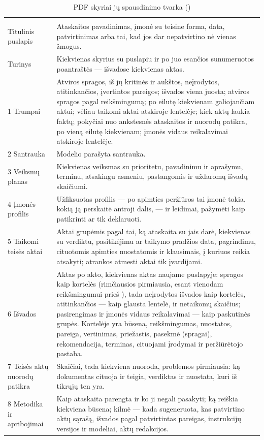 \begin{xltabular}{\textwidth}{@{}L{36mm}Y@{}}
\caption{PDF skyriai jų spausdinimo tvarka ()}\label{tab:report:pdf}\\
\toprule
{} &  \\
\midrule
\endfirsthead
\toprule
{} &  \\
\midrule
\endhead
\bottomrule
\endlastfoot
Titulinis puslapis & Ataskaitos pavadinimas, įmonė su teisine forma, data, patvirtinimas arba tai, kad jos dar nepatvirtino nė vienas žmogus. \\
Turinys & Kiekvienas skyrius su puslapiu ir po juo esančios sunumeruotos poantraštės --- išvadose kiekvienas aktas. \\
1 Trumpai & Atviros spragos, iš jų kritinės ir aukštos, neįrodytos, atitinkančios, įvertintos pareigos; išvados viena juosta; atviros spragos pagal reikšmingumą; po eilutę kiekvienam galiojančiam aktui; vėliau taikomi aktai atskiroje lentelėje; kiek aktų laukia faktų; pokyčiai nuo ankstesnės ataskaitos ir nuorodų patikra, po vieną eilutę kiekvienam; įmonės vidaus reikalavimai atskiroje lentelėje. \\
2 Santrauka & Modelio parašyta santrauka. \\
3 Veiksmų planas & Kiekvienas veiksmas su prioritetu, pavadinimu ir aprašymu, terminu, atsakingu asmeniu, pastangomis ir uždaromų išvadų skaičiumi. \\
4 Įmonės profilis & Užfiksuotas profilis --- po apimties peržiūros tai įmonė tokia, kokią ją perskaitė antroji dalis, --- ir leidimai, pažymėti kaip patikrinti ar tik deklaruoti. \\
5 Taikomi teisės aktai & Aktai grupėmis pagal tai, ką ataskaita su jais darė, kiekvienas su verdiktu, pasitikėjimu ar taikymo pradžios data, pagrindimu, cituotomis apimties nuostatomis ir klausimais, į kuriuos reikia atsakyti; atrankos atmesti aktai tik įvardijami. \\
6 Išvados & Aktas po akto, kiekvienas aktas naujame puslapyje: spragos kaip kortelės (rimčiausios pirmiausia, esant vienodam reikšmingumui  prieš ), tada neįrodytos išvados kaip kortelės, atitinkančios --- kaip glausta lentelė, ir netaikomų skaičius; pasirengimas ir įmonės vidaus reikalavimai --- kaip paskutinės grupės. Kortelėje yra būsena, reikšmingumas, nuostatos, pareiga, vertinimas, priežastis, pasekmė (spragai), rekomendacija, terminas, cituojami įrodymai ir peržiūrėtojo pastaba. \\
7 Teisės aktų nuorodų patikra & Skaičiai, tada kiekviena nuoroda, problemos pirmiausia: ką dokumentas cituoja ir teigia, verdiktas ir nuostata, kuri iš tikrųjų ten yra. \\
8 Metodika ir apribojimai & Kaip ataskaita parengta ir ko ji negali pasakyti; ką reiškia kiekviena būsena; kilmė --- kada sugeneruota, kas patvirtino aktų sąrašą, išvados pagal patvirtintas pareigas, instrukcijų versijos ir modeliai, aktų redakcijos. \\
\end{xltabular}


